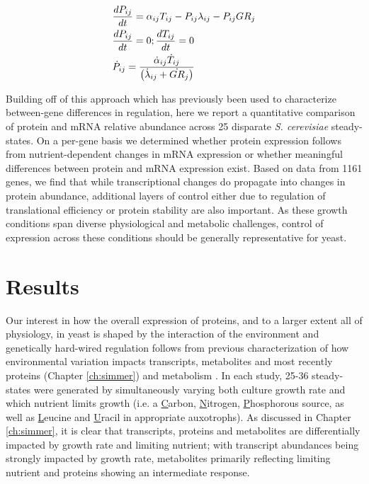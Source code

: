 \begin{align}
&\frac{dP_{ij}}{dt} = \alpha_{ij}T_{ij} - P_{ij}\lambda_{ij} - P_{ij}GR_{j}\notag\\
&\frac{dP_{ij}}{dt} = 0 ; \frac{dT_{ij}}{dt} = 0 \notag\\
&\dot{P}_{ij} = \frac{\dot{\alpha}_{ij}\dot{T}_{ij}}{\left(\dot{\lambda}_{ij} + \dot{GR}_{j}\right)}\label{steady_expression}
\end{align}


Building off of this approach which has previously been used to characterize between-gene differences in regulation, here we report a quantitative comparison of protein and mRNA relative abundance across 25 disparate \textit{S. cerevisiae} steady-states.  On a per-gene basis we determined whether protein expression follows from nutrient-dependent changes in mRNA expression or whether meaningful differences between protein and mRNA expression exist.  Based on data from 1161 genes, we find that while transcriptional changes do propagate into changes in protein abundance, additional layers of control either due to regulation of translational efficiency or protein stability are also important. As these growth conditions span diverse physiological and metabolic challenges, control of expression across these conditions should be generally representative for yeast.

\section{Results}

Our interest in how the overall expression of proteins, and to a larger extent all of physiology, in yeast is shaped by the interaction of the environment and genetically hard-wired regulation follows from previous characterization of how environmental variation impacts transcripts, metabolites and most recently proteins (Chapter \ref{ch:simmer}) and metabolism \cite{Brauer:2008jn, Boer:2010fb}. In each study, 25-36 steady-states were generated by simultaneously varying both culture growth rate and which nutrient limits growth (i.e. a \underline{C}arbon, \underline{N}itrogen, \underline{P}hosphorous source, as well as \underline{L}eucine and \underline{U}racil in appropriate auxotrophs). As discussed in Chapter \ref{ch:simmer}, it is clear that transcripts, proteins and metabolites are differentially impacted by growth rate and limiting nutrient; with transcript abundances being strongly impacted by growth rate, metabolites primarily reflecting limiting nutrient and proteins showing an intermediate response.

